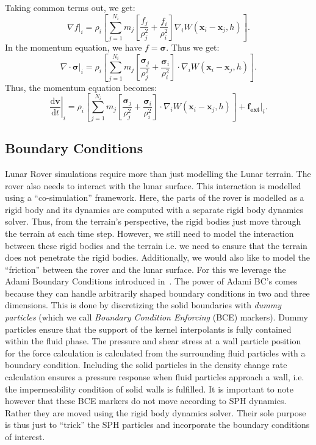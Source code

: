 \documentclass{article}
\newcommand{\vx}{\mathbf{x}}
\newcommand{\dd}{\mathrm{d}}
\newcommand{\vv}{\mathbf{v}}
\newcommand{\vsigma}{\bm{\sigma}}
\begin{document}
Taking common terms out, we get:
\begin{equation}
  \nabla f|_i =  \rho_i \left[\sum_{j=1}^{N_i} m_j \left[ \frac{f_j}{\rho_j^2} + \frac{f_i}{\rho_i^2} \right] \nabla_i W(\vx_i - \vx_j, h) \right].
\end{equation}
In the momentum equation, we have $f = \vsigma$. Thus we get:
\begin{equation}
  \nabla \cdot \vsigma|_i =  \rho_i \left[\sum_{j=1}^{N_i} m_j \left[ \frac{\vsigma_j}{\rho_j^2} + \frac{\vsigma_i}{\rho_i^2} \right] \cdot \nabla_i W(\vx_i - \vx_j, h) \right].
\end{equation}
Thus, the momentum equation becomes:
\begin{equation}
  \label{eq:momentumEquationSPHDiscretized}
  \left. \frac{\dd \vv}{\dd t}\right|_i = \rho_i \left[\sum_{j=1}^{N_i} m_j \left[ \frac{\vsigma_j}{\rho_j^2} + \frac{\vsigma_i}{\rho_i^2} \right] \cdot \nabla_i W(\vx_i - \vx_j, h) \right] + \mathbf{f_{ext}}|_i.
\end{equation}
\subsection*{Boundary Conditions}
Lunar Rover simulations require more than just modelling the Lunar terrain. The rover also needs to interact with the lunar surface. This interaction is modelled using a ``co-simulation'' framework. Here, the parts of the rover is modelled as a rigid body and its dynamics are computed with a separate rigid body dynamics solver. Thus, from the terrain's perspective, the rigid bodies just move through the terrain at each time step. However, we still need to model the interaction between these rigid bodies and the terrain i.e. we need to ensure that the terrain does not penetrate the rigid bodies. Additionally, we would also like to model the ``friction'' between the rover and the lunar surface. For this we leverage the Adami Boundary Conditions introduced in~\citep{adami2012generalized}. The power of Adami BC's comes because they can handle arbitrarily shaped boundary conditions in two and three dimensions. This is done by discretizing the solid boundaries with \textit{dummy particles} (which we call \textit{Boundary Condition Enforcing} (BCE) markers). Dummy particles ensure that the support of the kernel interpolants is fully contained within the fluid phase. The pressure and shear stress at a wall particle position for the force calculation is calculated from the surrounding fluid particles with a boundary condition. Including the solid particles in the density change rate calculation ensures a pressure response when fluid particles approach a wall, i.e. the impermeability condition of solid walls is fulfilled. It is important to note however that these BCE markers do not move according to SPH dynamics. Rather they are moved using the rigid body dynamics solver. Their sole purpose is thus just to ``trick'' the SPH particles and incorporate the boundary conditions of interest.
\end{document}
